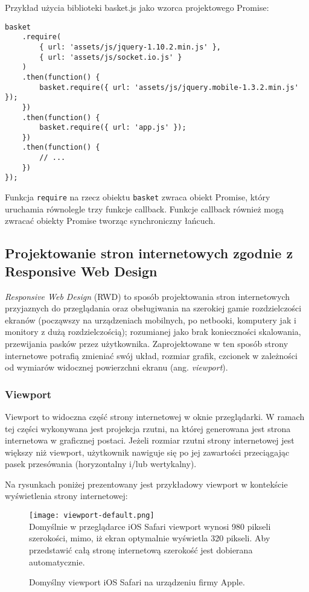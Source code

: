Przykład użycia biblioteki basket.js jako wzorca projektowego Promise:

\lstset{language=JavaScript}
\begin{lstlisting}
basket
    .require(
		{ url: 'assets/js/jquery-1.10.2.min.js' },
		{ url: 'assets/js/socket.io.js' }
	)
    .then(function() {
        basket.require({ url: 'assets/js/jquery.mobile-1.3.2.min.js' });
    })
	.then(function() {
        basket.require({ url: 'app.js' });
    })
	.then(function() {
	 	// ...
	})
});
\end{lstlisting}

Funkcja \lstinline{require} na rzecz obiektu \lstinline{basket} zwraca obiekt Promise, który uruchamia równolegle trzy funkcje callback. Funkcje callback również mogą zwracać obiekty Promise tworząc synchroniczny łańcuch.

\subsection{Projektowanie stron internetowych zgodnie z Responsive Web Design}
\label{subsubsec:rwd}

\emph{Responsive Web Design} (RWD) to sposób projektowania stron internetowych przyjaznych do przeglądania oraz obsługiwania na szerokiej gamie rozdzielczości ekranów (począwszy na urządzeniach mobilnych, po netbooki, komputery jak i monitory z dużą rozdzielczością)\cite{rwd}; rozumianej jako brak konieczności skalowania, przewijania pasków przez użytkownika. Zaprojektowane w ten sposób strony internetowe potrafią zmieniać swój układ, rozmiar grafik, czcionek w zależności od wymiarów widocznej powierzchni ekranu (ang. \emph{viewport}).

\subsubsection{Viewport}

Viewport to widoczna część strony internetowej w oknie przeglądarki. W ramach tej części wykonywana jest projekcja rzutni, na której generowana jest strona internetowa w graficznej postaci. Jeżeli rozmiar rzutni strony internetowej jest większy niż viewport, użytkownik nawiguje się po jej zawartości przeciągając pasek przesówania (horyzontalny i/lub wertykalny).

Na rysunkach poniżej prezentowany jest przykładowy viewport w kontekście wyświetlenia strony internetowej:

\begin{figure}[h!]
  \caption[Apple default viewport w Safari iOS]{Domyślny viewport iOS Safari na urządzeniu firmy Apple.}
  \centering
    \texttt{[image: viewport-default.png]} \\
    Domyślnie w przeglądarce iOS Safari viewport wynosi 980 pikseli szerokości, mimo, iż ekran optymalnie wyświetla 320 pikseli. Aby przedstawić całą stronę internetową szerokość jest dobierana automatycznie.
\end{figure}

